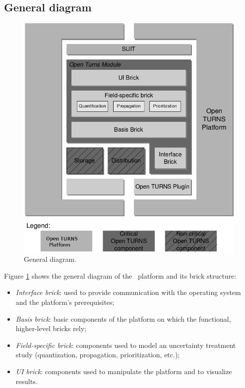 \label{diagram}\subsection{General diagram}

\begin{figure}[htb]
  \begin{center}
    \includegraphics[scale=0.7]{Figures/analysis/general_overview.png}
    \caption{General diagram.}\label{fig:general_overview}
  \end{center}
\end{figure}

Figure \ref{fig:general_overview} shows the general diagram of the \OT\ platform and its brick structure:
\begin{itemize}
\item \emph{Interface brick}: used to provide communication with the operating system and the platform's prerequisites;
\item \emph{Basis brick}: basic components of the platform on which the functional, higher-level bricks rely;
\item \emph{Field-specific brick}: components used to model an uncertainty treatment study (quantization, propagation, prioritization, etc.);
\item \emph{UI brick}: components used to manipulate the platform and to visualize results.
\end{itemize}

